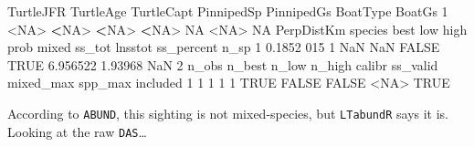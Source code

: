 \documentclass[
]{book}
\newenvironment{Shaded}{\begin{snugshade}}{\end{snugshade}}
\newcommand{\ConstantTok}[1]{\textcolor[rgb]{0.00,0.00,0.00}{#1}}
\newcommand{\DecValTok}[1]{\textcolor[rgb]{0.00,0.00,0.81}{#1}}
\newcommand{\ErrorTok}[1]{\textcolor[rgb]{0.64,0.00,0.00}{\textbf{#1}}}
\newcommand{\FloatTok}[1]{\textcolor[rgb]{0.00,0.00,0.81}{#1}}
\newcommand{\NormalTok}[1]{#1}
\newcommand{\SpecialCharTok}[1]{\textcolor[rgb]{0.00,0.00,0.00}{#1}}
\begin{document}
\begin{Shaded}
\begin{Highlighting}[]
\NormalTok{  TurtleJFR TurtleAge TurtleCapt PinnipedSp PinnipedGs BoatType BoatGs}
\DecValTok{1}      \SpecialCharTok{\textless{}}\ConstantTok{NA}\SpecialCharTok{\textgreater{}}      \ErrorTok{\textless{}}\ConstantTok{NA}\SpecialCharTok{\textgreater{}}       \ErrorTok{\textless{}}\ConstantTok{NA}\SpecialCharTok{\textgreater{}}       \ErrorTok{\textless{}}\ConstantTok{NA}\SpecialCharTok{\textgreater{}}         \ConstantTok{NA}     \SpecialCharTok{\textless{}}\ConstantTok{NA}\SpecialCharTok{\textgreater{}}     \ConstantTok{NA}
\NormalTok{  PerpDistKm species best low high  prob mixed   ss\_tot lnsstot ss\_percent n\_sp}
\DecValTok{1}     \FloatTok{0.1852}     \DecValTok{015}    \DecValTok{1} \ConstantTok{NaN}  \ConstantTok{NaN} \ConstantTok{FALSE}  \ConstantTok{TRUE} \FloatTok{6.956522} \FloatTok{1.93968}        \ConstantTok{NaN}    \DecValTok{2}
\NormalTok{  n\_obs n\_best n\_low n\_high calibr ss\_valid mixed\_max spp\_max included}
\DecValTok{1}     \DecValTok{1}      \DecValTok{1}     \DecValTok{1}      \DecValTok{1}   \ConstantTok{TRUE}    \ConstantTok{FALSE}     \ConstantTok{FALSE}    \SpecialCharTok{\textless{}}\ConstantTok{NA}\SpecialCharTok{\textgreater{}}     \ConstantTok{TRUE}
\end{Highlighting}
\end{Shaded}

According to \texttt{ABUND}, this sighting is not mixed-species, but \texttt{LTabundR} says it is. Looking at the raw \texttt{DAS}\ldots{}
\end{document}
